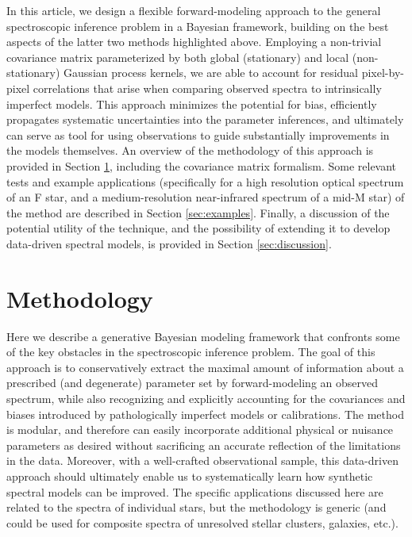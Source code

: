 \documentclass[iop,floatfix]{emulateapj}
\begin{document}
In this article, we design a flexible forward-modeling approach to the general spectroscopic 
inference problem in a Bayesian framework, building on the best aspects of the latter two methods 
highlighted above.  Employing a non-trivial covariance matrix parameterized by both global 
(stationary) and local (non-stationary) Gaussian process kernels, we are able to account for 
residual pixel-by-pixel correlations that arise when comparing observed spectra to intrinsically 
imperfect models.  This approach minimizes the potential for bias, efficiently propagates 
systematic uncertainties into the parameter inferences, and ultimately can serve as tool for using
observations to guide substantially improvements in the models themselves.  An overview of the 
methodology of this approach is provided in Section \ref{sec:method}, including the covariance 
matrix formalism.  Some relevant tests and example applications (specifically for a high resolution 
optical spectrum of an F star, and a medium-resolution near-infrared spectrum of a mid-M star) of 
the method are described in Section \ref{sec:examples}.  Finally, a discussion of the potential 
utility of the technique, and the possibility of extending it to develop data-driven spectral 
models, is provided in Section \ref{sec:discussion}.  


\section{Methodology} \label{sec:method}

Here we describe a generative Bayesian modeling framework that confronts some of the key obstacles 
in the spectroscopic inference problem.  The goal of this approach is to conservatively extract the 
maximal amount of information about a prescribed (and degenerate) parameter set by forward-modeling 
an observed spectrum, while also recognizing and explicitly accounting for the covariances and 
biases introduced by pathologically imperfect models or calibrations.  The method is modular, and 
therefore can easily incorporate additional physical or nuisance parameters as desired without 
sacrificing an accurate reflection of the limitations in the data.  Moreover, with a well-crafted 
observational sample, this data-driven approach should ultimately enable us to systematically learn 
how synthetic spectral models can be improved.  The specific applications discussed here are 
related to the spectra of individual stars, but the methodology is generic (and could be used for 
composite spectra of unresolved stellar clusters, galaxies, etc.).  
\end{document}
